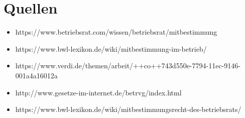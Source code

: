 \documentclass[
  a4paper,            %
  DIV=10,             %
  oneside,            %
  BCOR=5mm,           %
  parskip=half,       %
  numbers=noenddot    %
]{scrartcl}
\begin{document}
\section{Quellen}
   \begin{itemize}
   	\item 
   	https://www.betriebsrat.com/wissen/betriebsrat/mitbestimmung
   	\item  
   	https://www.bwl-lexikon.de/wiki/mitbestimmung-im-betrieb/
	\item 
	https://www.verdi.de/themen/arbeit/++co++743d550e-7794-11ec-9146-001a4a16012a
	\item
	http://www.gesetze-im-internet.de/betrvg/index.html 
	\item 
	https://www.bwl-lexikon.de/wiki/mitbestimmungsrecht-des-betriebsrats/
\end{itemize}

%
%

\clearpage
\end{document}
